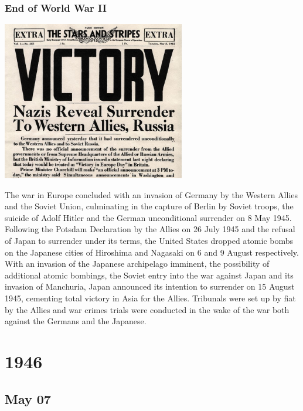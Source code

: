 \documentclass[11pt]{report}
\begin{document}
\subsection{End of World War II}
\vspace{2mm}\begin{center}\includegraphics[width=8cm]{./img/endww2.jpg}\end{center}
The war in Europe concluded with an invasion of Germany by the Western Allies and the Soviet Union, culminating in the capture of Berlin by Soviet troops, the suicide of Adolf Hitler and the German unconditional surrender on 8 May 1945. Following the Potsdam Declaration by the Allies on 26 July 1945 and the refusal of Japan to surrender under its terms, the United States dropped atomic bombs on the Japanese cities of Hiroshima and Nagasaki on 6 and 9 August respectively. With an invasion of the Japanese archipelago imminent, the possibility of additional atomic bombings, the Soviet entry into the war against Japan and its invasion of Manchuria, Japan announced its intention to surrender on 15 August 1945, cementing total victory in Asia for the Allies. Tribunals were set up by fiat by the Allies and war crimes trials were conducted in the wake of the war both against the Germans and the Japanese.

\chapter{1946}
\section{May 07}
\end{document}
